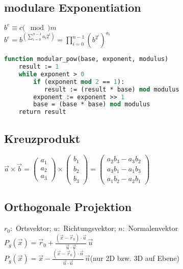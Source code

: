 \documentclass[10pt,a4paper,ngerman,oneside,
]{article}
\begin{document}
\subsection{modulare Exponentiation}
$b^e \equiv c (\mod) m$\\
$b^e = b^{\left( \sum_{i=0}^{n-1} a_i 2^i \right)} = \prod_{i=0}^{n-1} \left( b^{2^i} \right) ^ {a_i}$
\begin{lstlisting}[language=pascal]
function modular_pow(base, exponent, modulus)
    result := 1
    while exponent > 0
        if (exponent mod 2 == 1):
           result := (result * base) mod modulus
        exponent := exponent >> 1
        base = (base * base) mod modulus
    return result
\end{lstlisting}
\subsection{Kreuzprodukt}
$\vec{a}\times\vec{b}
  =
  \begin{pmatrix}a_1 \\ a_2 \\ a_3\end{pmatrix}
  \times
  \begin{pmatrix}b_1 \\ b_2 \\ b_3 \end{pmatrix}
  =
  \begin{pmatrix}
    a_2b_3 - a_3b_2 \\
    a_3b_1 - a_1b_3 \\
    a_1b_2 - a_2b_1
  \end{pmatrix}$
\subsection{Orthogonale Projektion}
$r_0:$ Ortsvektor; $u:$ Richtungsvektor; $n:$ Normalenvektor\\
$P_g(\vec x) =  \vec r_0 + \frac{( \vec x - \vec r_0 ) \cdot \vec u}{\vec u \cdot \vec u} \, \vec u$\\
$P_g(\vec x) = \vec x - \frac{( \vec x - \vec r_0 ) \cdot \vec n}{\vec n \cdot \vec n} \, \vec n$(nur 2D bzw. 3D auf Ebene)\\
\end{document}
